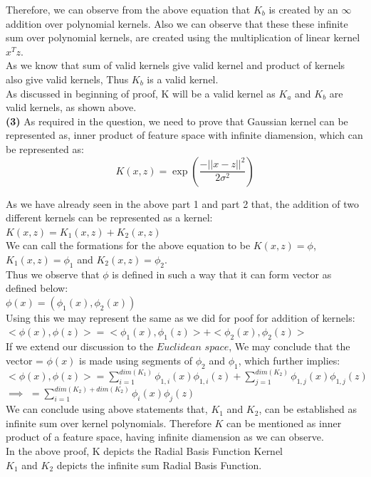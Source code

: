 \documentclass[11pt]{article}
\renewcommand\part[1]{\vspace{.10in}\textbf{(#1)}}
\begin{document}
Therefore, we can observe from the above equation that $K_b$ is created by an $\infty$ addition over polynomial kernels. Also we can observe that these these infinite sum over polynomial kernels, are created using the multiplication of linear kernel $x^Tz$.\\
As we know that sum of valid kernels give valid kernel and product of kernels also give valid kernels, Thus $K_b$ is a valid kernel.\\
As discussed in beginning of proof, K will be a valid kernel as $K_a$ and $K_b$ are valid kernels, as shown above.\\ 

\part{3}
As required in the question, we need to prove that Gaussian kernel can be represented as, inner product of feature space with infinite diamension, which can be represented as:\\
\[K(x,z) = \exp(\dfrac{-||x-z||^2}{2{\sigma}^2})\]

As we have already seen in the above part 1 and part 2 that, the addition of two different kernels can be represented as a kernel:\\
$K(x,z) = K_1(x,z) + K_2(x,z)$\\
We can call the formations for the above equation to be $K(x,z)=\phi$, $K_{1}(x,z)=\phi_1$ and $K_{2}(x,z)=\phi_2$.\\
Thus we observe that $\phi$ is defined in such a way that it can form vector as defined below:\\
$\phi(x) = (\phi_1(x), \phi_2(x))$\\
Using this we may represent the same as we did for poof for addition of kernels:\\
$<\phi(x),\phi(z)> = <\phi_1(x), \phi_1(z)> + <\phi_2(x), \phi_2(z)>$\\
If we extend our discussion to the $Euclidean$ $space$, We may conclude that the vector = $\phi(x)$ is made using segments of $\phi_2$ and $\phi_1$, which further implies:\\[15pt]
$<\phi(x), \phi(z)> = \sum_{i=1}^{dim(K_1)} \phi_{1,i}(x)\phi_{1,i}(z) + \sum_{j=1}^{dim(K_2)} \phi_{1,j}(x)\phi_{1,j}(z)$\\[15pt]
$\implies$ $= \sum_{i=1}^{dim(K_2)+dim(K_2)} \phi_{i}(x)\phi_{j}(z)$\\[10pt]

We can conclude using above statements that, $K_1$ and $K_2$, can be established as infinite sum over kernel polynomials. Therefore $K$ can be mentioned as inner product of a feature space, having infinite diamension as we can observe.\\
In the above proof, K depicts the Radial Basis Function Kernel\\
$K_1$ and $K_2$ depicts the infinite sum Radial Basis Function.\\
\end{document}
